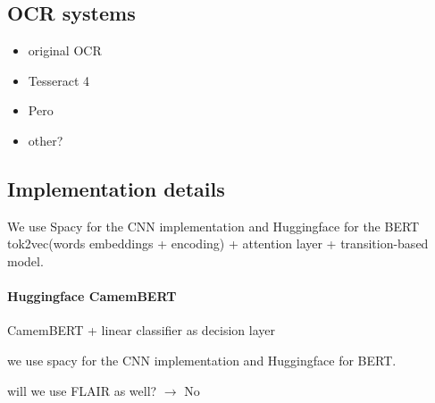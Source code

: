 \subsection{OCR systems}
\begin{itemize}
    \item original OCR
    \item Tesseract 4
    \item Pero
    \item other?
\end{itemize}

\subsection{Implementation details}
We use Spacy for the CNN implementation
and Huggingface for the BERT 
tok2vec(words embeddings + encoding) + attention layer  +  transition-based model.

\paragraph{Huggingface CamemBERT}
CamemBERT + linear classifier as decision layer



we use spacy  for the CNN implementation and Huggingface for BERT.

will we use FLAIR as well? $\rightarrow$ No